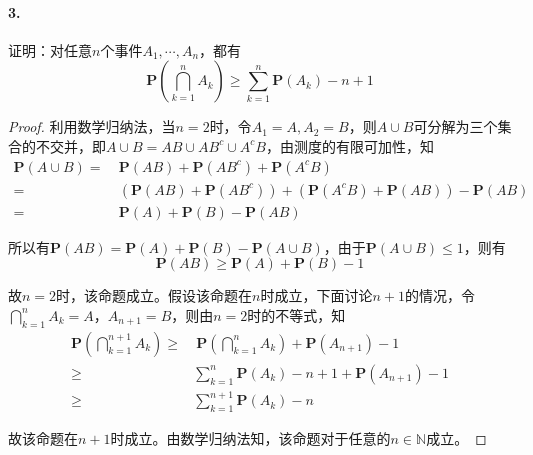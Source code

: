 \documentclass[12pt, a4paper, oneside]{ctexart}
\begin{document}
\paragraph{3.}证明：对任意$n$个事件$A_1,\cdots,A_n$，都有
\begin{equation*}
    \textbf{P}\left(\bigcap_{k=1}^nA_k\right)\geqslant\sum_{k=1}^n\textbf{P}(A_k)-n+1
\end{equation*}
\begin{proof}
    利用数学归纳法，当$n=2$时，令$A_1 = A, A_2 = B$，则$A\cup B$可分解为三个集合的不交并，即$A\cup B = AB\cup AB^c\cup A^cB$，由测度的有限可加性，知
    \begin{equation*}
        \begin{aligned}
            \textbf{P}(A\cup B) =&\ \textbf{P}(AB)+\textbf{P}(AB^c)+\textbf{P}(A^cB)\\
            =&\ (\textbf{P}(AB)+\textbf{P}(AB^c))+(\textbf{P}(A^cB)+\textbf{P}(AB))-\textbf{P}(AB)\\
            =&\ \textbf{P}(A)+\textbf{P}(B)-\textbf{P}(AB)
        \end{aligned}
    \end{equation*}

    所以有$\textbf{P}(AB) = \textbf{P}(A)+\textbf{P}(B)-\textbf{P}(A\cup B)$，由于$\textbf{P}(A\cup B)\leqslant 1$，则有
    \begin{equation*}
        \textbf{P}(AB) \geqslant \textbf{P}(A)+\textbf{P}(B)-1
    \end{equation*}

    故$n=2$时，该命题成立。假设该命题在$n$时成立，下面讨论$n+1$的情况，令$\bigcap\limits_{k=1}^nA_k = A$，$A_{n+1} = B$，则由$n=2$时的不等式，知
    \begin{equation*}
        \begin{aligned}
            \textbf{P}(\bigcap_{k=1}^{n+1}A_k)\geqslant&\ \textbf{P}(\bigcap_{k=1}^nA_k)+\textbf{P}(A_{n+1}) - 1\\
            \geqslant & \sum_{k=1}^n\textbf{P}(A_k) - n+1+\textbf{P}(A_{n+1})-1\\
            \geqslant & \sum_{k=1}^{n+1}\textbf{P}(A_k)-n
        \end{aligned}
    \end{equation*}

    故该命题在$n+1$时成立。由数学归纳法知，该命题对于任意的$n\in \mathbb{N}$成立。
\end{proof}
\end{document}
